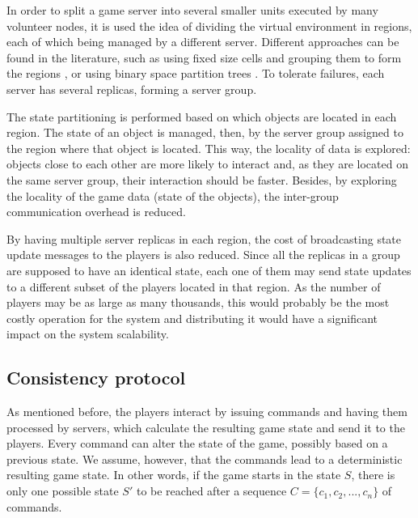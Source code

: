 \documentclass[]{usiinfprospectus}
\begin{document}
In order to split a game server into several smaller units executed by many volunteer nodes, it is used the idea of dividing the virtual environment in regions, each of which being managed by a different server. Different approaches can be found in the literature, such as using fixed size cells and grouping them to form the regions \cite{devleeschauwer2005dma}, or using binary space partition trees \cite{bezerra2009fgl}. To tolerate failures, each server has several replicas, forming a server group.

The state partitioning is performed based on which objects are located in each region. The state of an object is managed, then, by the server group assigned to the region where that object is located. This way, the locality of data is explored: objects close to each other are more likely to interact and, as they are located on the same server group, their interaction should be faster. Besides, by exploring the locality of the game data (state of the objects), the inter-group communication overhead is reduced.

By having multiple server replicas in each region, the cost of broadcasting state update messages to the players is also reduced. Since all the replicas in a group are supposed to have an identical state, each one of them may send state updates to a different subset of the players located in that region. As the number of players may be as large as many thousands, this would probably be the most costly operation for the system and distributing it would have a significant impact on the system scalability.

\subsection{Consistency protocol} \label{sec:consprot}

As mentioned before, the players interact by issuing commands and having them processed by servers, which calculate the resulting game state and send it to the players. Every command can alter the state of the game, possibly based on a previous state. We assume, however, that the commands lead to a deterministic resulting game state. In other words, if the game starts in the state $S$, there is only one possible state $S'$ to be reached after a sequence $C=\{c_{1}, c_{2}, ..., c_{n}\}$ of commands.
\end{document}
